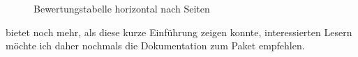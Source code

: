 \begin{figure}
\caption{Bewertungstabelle horizontal nach Seiten}\label{fig:ver}
\end{figure} 


 bietet noch mehr, als diese kurze Einführung zeigen konnte, interessierten Lesern möchte ich daher nochmals die Dokumentation zum Paket empfehlen. 